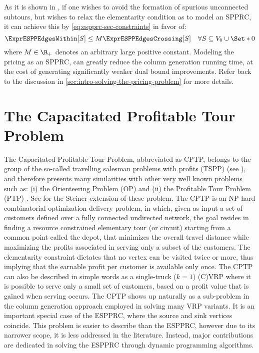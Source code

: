 As it is shown in \textcite{beasley1989},
if one wishes to avoid the formation of spurious unconnected subtours,
but wishes to relax the elementarity condition as to model an SPPRC,
it can achieve this by \cref{eq:espprc-sec-constraints} in favor of:
\begin{equation}
	\ExprESPPEdgesWithin[S] \le M \ExprESPPEdgesCrossing[S] \quad \forall S \subseteq V_0 \cup \Set*{0}
\end{equation}
where $M \in \R_+$ denotes an arbitrary large positive constant.
Modeling the pricing as an SPPRC, can greatly reduce
the column generation running time, at the cost
of generating significantly weaker dual bound improvements.
Refer back to the discussion in \cref{sec:intro-solving-the-pricing-problem}
for more details.

\section{The Capacitated Profitable Tour Problem}
\label{sec:the-capacitated-profitable-tour-problem}

The Capacitated Profitable Tour Problem, abbreviated as CPTP,
belongs to the group of the so-called travelling salesman
problems with profits (TSPP) (see \cite{feillet2005}),
and therefore presents many similarities with other very well known
problems such as:
(i) the Orienteering Problem (OP) \parencite{golden1987, laporte1990}
and (ii) the Profitable Tour Problem (PTP) \parencite{dellamico1995}.
See \textcite{letchford2013} for the Steiner extension of these problem.
The CPTP is an NP-hard combinatorial optimization delivery problem,
in which,
given as input a set of customers
defined over a fully connected undirected network, the goal resides in finding
a resource constrained elementary tour (or circuit) starting from a common point called the depot,
that minimizes the overall travel distance while maximizing
the profits associated in serving only a subset of the customers.
The elementarity constraint dictates that no vertex
can be visited twice or more, thus implying that the earnable profit
per customer is available only once.
The CPTP can also be described in simple words
as a single-truck ($k = 1$) (C)VRP where it is possible to serve only a small set of customers,
based on a profit value that is gained when serving occurs.
The CPTP shows up naturally as a sub-problem in the column generation approach employed in solving many VRP variants.
It is an important special case of the ESPPRC, where the source and sink vertices coincide.
This problem is easier to describe than the ESPPRC,
however due to its narrower scope,
it is less addressed in the literature.
Instead, major contributions are dedicated in solving the ESPPRC through dynamic programming algorithms.

